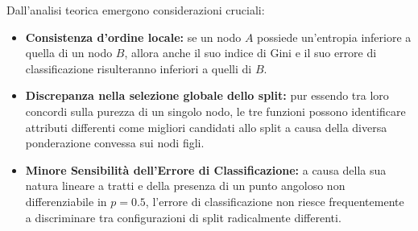 Dall'analisi teorica emergono considerazioni cruciali:
\begin{itemize}
    \item \textbf{Consistenza d'ordine locale:} se un nodo $A$ possiede un'entropia inferiore a quella di un nodo $B$, allora anche il suo indice di Gini e il suo errore di classificazione risulteranno inferiori a quelli di $B$.
    \item \textbf{Discrepanza nella selezione globale dello split:} pur essendo tra loro concordi sulla purezza di un singolo nodo, le tre funzioni possono identificare attributi differenti come migliori candidati allo split a causa della diversa ponderazione convessa sui nodi figli.
    \item \textbf{Minore Sensibilità dell'Errore di Classificazione:} a causa della sua natura lineare a tratti e della presenza di un punto angoloso non differenziabile in $p = 0.5$, l'errore di classificazione non riesce frequentemente a discriminare tra configurazioni di split radicalmente differenti.
\end{itemize}

